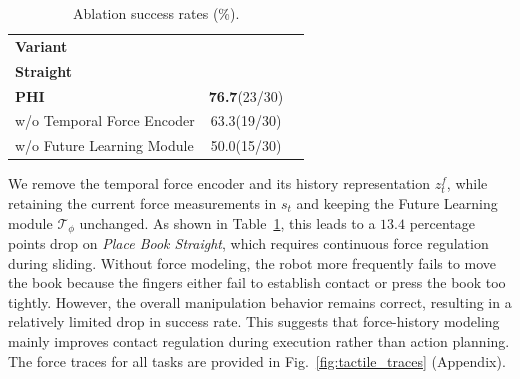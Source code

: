 \documentclass{article} %
\begin{document}
\begin{table}
    \centering
    \small
    \setlength{\tabcolsep}{5pt}
    \renewcommand{\arraystretch}{1.08}
    \captionsetup{font=small,skip=4pt}
    \caption{Ablation success rates (\%).}
    \label{tab:ablations}
    \begin{tabular}{@{}lcc@{}}
        \toprule
        \textbf{Variant}
        & \shortstack{\textbf{Place Book}\\\textbf{Straight}} \\
        \midrule
        \textbf{PHI} & \textbf{76.7}(23/30)  \\
        w/o Temporal Force Encoder & 63.3(19/30)  \\
        w/o Future Learning Module & 50.0(15/30)  \\
        \bottomrule
    \end{tabular}
\end{table}
We remove the temporal force encoder and its history representation $z_t^f$, while retaining the current force measurements in $s_t$ and keeping the Future Learning module
$\mathcal{T}_{\phi}$ unchanged. As shown in Table~\ref{tab:ablations}, this leads to a $13.4$ percentage points drop on \textit{Place Book Straight}, which requires continuous force regulation during sliding. Without force modeling, the robot more frequently fails to move the book because the fingers either fail to establish contact or press the book too tightly. However, the overall manipulation behavior remains correct, resulting in a relatively limited drop in success rate. This suggests that force-history modeling mainly improves contact regulation during execution rather than action planning. The force traces for all tasks are provided in Fig.~\ref{fig:tactile_traces} (Appendix).
\end{document}
